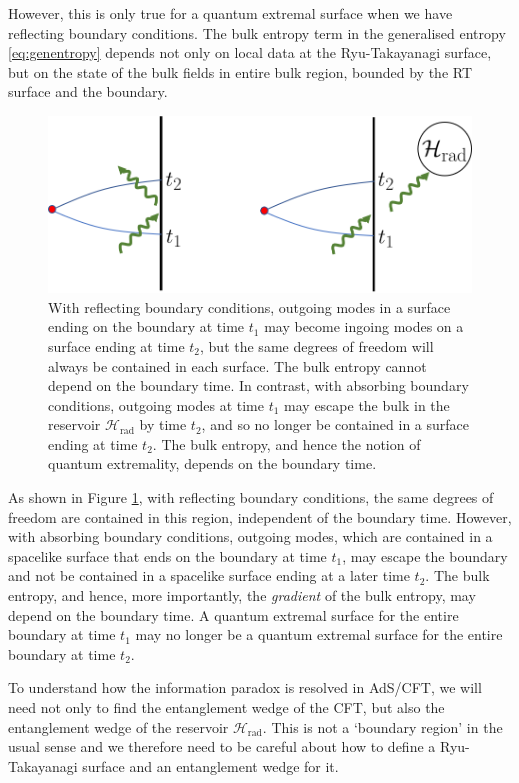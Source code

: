 \documentclass[12pt]{article}
\begin{document}
However, this is only true for a quantum extremal surface when we have reflecting boundary conditions. The bulk entropy term in the generalised entropy \eqref{eq:genentropy} depends not only on local data at the Ryu-Takayanagi surface, but on the state of the bulk fields in entire bulk region, bounded by the RT surface and the boundary.  
\begin{figure}[t]
\includegraphics[width = 0.5\linewidth]{TimeDependence.png}
\centering
\caption{With reflecting boundary conditions, outgoing modes in a surface ending on the boundary at time $t_1$ may become ingoing modes on a surface ending at time $t_2$, but the same degrees of freedom will always be contained in each surface. The bulk entropy cannot depend on the boundary time. In contrast, with absorbing boundary conditions, outgoing modes at time $t_1$ may escape the bulk in the reservoir $\mathcal{H}_\text{rad}$ by time $t_2$, and so no longer be contained in a surface ending at time $t_2$. The bulk entropy, and hence the notion of quantum extremality, depends on the boundary time.}
\label{fig:bcs}
\end{figure}

As shown in Figure \ref{fig:bcs}, with reflecting boundary conditions, the same degrees of freedom are contained in this region, independent of the boundary time. However, with absorbing boundary conditions, outgoing modes, which are contained in a spacelike surface that ends on the boundary at time $t_1$, may escape the boundary and not be contained in a spacelike surface ending at a later time $t_2$. The bulk entropy, and hence, more importantly, the \emph{gradient} of the bulk entropy, may depend on the boundary time. A quantum extremal surface for the entire boundary at time $t_1$ may no longer be a quantum extremal surface for the entire boundary at time $t_2$. 

To understand how the information paradox is resolved in AdS/CFT, we will need not only to find the entanglement wedge of the CFT, but also the entanglement wedge of the reservoir $\mathcal{H}_\text{rad}$. This is not a `boundary region' in the usual sense and we therefore need to be careful about how to define a Ryu-Takayanagi surface and an entanglement wedge for it. 
\end{document}
